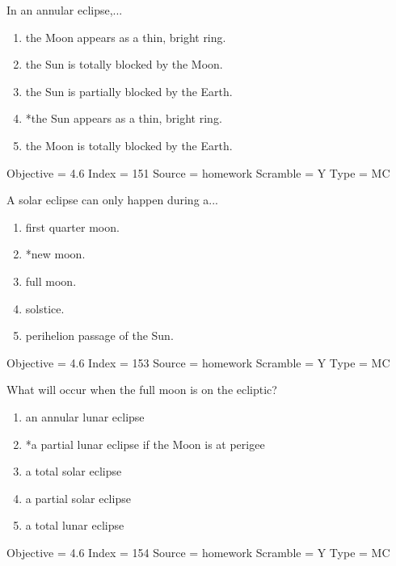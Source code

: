 \documentclass[11pt]{article}
\begin{document}
\begin{enumerate}
\begin{minipage}{\textwidth}
\begin{minipage}{\textwidth}
\item In an annular eclipse,...
\begin{enumerate} 
\setlength{\itemsep}{1pt} 
\setlength{\parskip}{0pt} 
\setlength{\parsep}{0pt}
\setlength{\multicolsep}{1pt} 
\item the Moon appears as a thin, bright ring.
\item the Sun is totally blocked by the Moon.
\item the Sun is partially blocked by the Earth.
\item *the Sun appears as a thin, bright ring.
\item the Moon is totally blocked by the Earth.
\end{enumerate} 
Objective = 4.6
Index = 151
Source = homework
Scramble = Y
Type = MC
\end{minipage}
\end{minipage}
\vskip 0.20in

\begin{minipage}{\textwidth}
\begin{minipage}{\textwidth}
\item A solar eclipse can only happen during a...
\begin{multicols}{2}
\begin{enumerate} 
\setlength{\itemsep}{1pt} 
\setlength{\parskip}{0pt} 
\setlength{\parsep}{0pt}
\setlength{\multicolsep}{1pt} 
\item first quarter moon.
\item *new moon.
\item full moon.
\item solstice.
\item perihelion passage of the Sun.
\end{enumerate} 
\vfill 
\end{multicols}

Objective = 4.6
Index = 153
Source = homework
Scramble = Y
Type = MC
\end{minipage}
\end{minipage}
\vskip 0.20in

\begin{minipage}{\textwidth}
\begin{minipage}{\textwidth}
\item What will occur when the full moon is on the ecliptic?
\begin{enumerate} 
\setlength{\itemsep}{1pt} 
\setlength{\parskip}{0pt} 
\setlength{\parsep}{0pt}
\setlength{\multicolsep}{1pt} 
\item an annular lunar eclipse
\item *a partial lunar eclipse if the Moon is at perigee
\item a total solar eclipse
\item a partial solar eclipse
\item a total lunar eclipse
\end{enumerate} 
Objective = 4.6
Index = 154
Source = homework
Scramble = Y
Type = MC
\end{minipage}
\end{minipage}
\vskip 0.20in


\end{enumerate}
\end{document}
